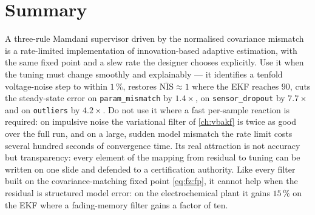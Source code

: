 \section{Summary}
A three-rule Mamdani supervisor driven by the normalised covariance mismatch is a rate-limited
implementation of innovation-based adaptive estimation, with the same fixed point and a slew rate
the designer chooses explicitly.  Use it when the tuning must change smoothly and explainably --- it
identifies a tenfold voltage-noise step to within $1\,\%$, restores $\overline{\mathrm{NIS}}\approx1$
where the EKF reaches $90$, cuts the steady-state error on \texttt{param\_mismatch}
by $1.4\times$, on \texttt{sensor\_dropout} by $7.7\times$ and on \texttt{outliers} by $4.2\times$.  Do not use it where a fast per-sample reaction is required: on
impulsive noise the variational filter of \cref{ch:vbakf} is twice as good over the full run, and on a large,
sudden model mismatch the rate limit costs several hundred seconds of convergence time.  Its real
attraction is not accuracy but transparency: every element of the mapping from residual to tuning
can be written on one slide and defended to a certification authority.  Like every filter built on
the covariance-matching fixed point \eqref{eq:fz:fp}, it cannot help when the residual is structured
model error: on the electrochemical plant it gains $15\,\%$ on the EKF where a fading-memory filter
gains a factor of ten.

